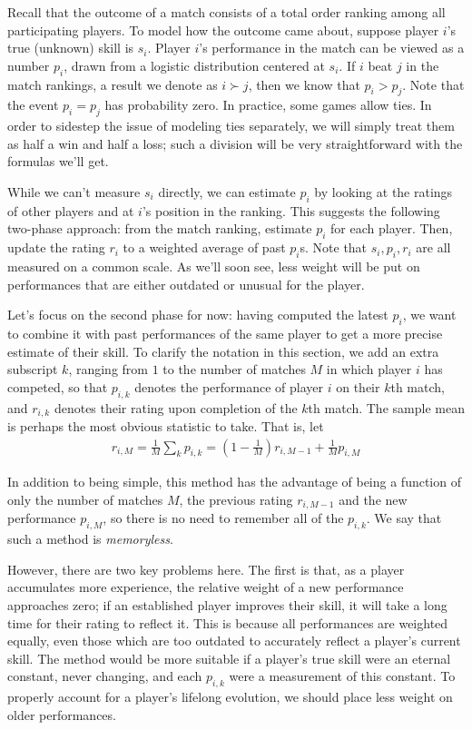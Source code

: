\documentclass{article}
\begin{document}
Recall that the outcome of a match consists of a total order ranking among all participating players. To model how the outcome came about, suppose player $i$'s true (unknown) skill is $s_i$. Player $i$'s performance in the match can be viewed as a number $p_i$, drawn from a logistic distribution centered at $s_i$. If $i$ beat $j$ in the match rankings, a result we denote as $i \succ j$, then we know that $p_i > p_j$. Note that the event $p_i = p_j$ has probability zero. In practice, some games allow ties. In order to sidestep the issue of modeling ties separately, we will simply treat them as half a win and half a loss; such a division will be very straightforward with the formulas we'll get.

While we can't measure $s_i$ directly, we can estimate $p_i$ by looking at the ratings of other players and at $i$'s position in the ranking. This suggests the following two-phase approach: from the match ranking, estimate $p_i$ for each player. Then, update the rating $r_i$ to a weighted average of past $p_i$s. Note that $s_i,p_i,r_i$ are all measured on a common scale. As we'll soon see, less weight will be put on performances that are either outdated or unusual for the player.

Let's focus on the second phase for now: having computed the latest $p_i$, we want to combine it with past performances of the same player to get a more precise estimate of their skill. To clarify the notation in this section, we add an extra subscript $k$, ranging from $1$ to the number of matches $M$ in which player $i$ has competed, so that $p_{i,k}$ denotes the performance of player $i$ on their $k$th match, and $r_{i,k}$ denotes their rating upon completion of the $k$th match. The sample mean is perhaps the most obvious statistic to take. That is, let
\begin{align}
r_{i,M} = \frac{1}{M} \sum_k p_{i,k} = \left(1 - \frac{1}{M}\right) r_{i,M-1} +  \frac{1}{M} p_{i,M}
\end{align}

In addition to being simple, this method has the advantage of being a function of only the number of matches $M$, the previous rating $r_{i,M-1}$ and the new performance $p_{i,M}$, so there is no need to remember all of the $p_{i,k}$. We say that such a method is \emph{memoryless}.

However, there are two key problems here. The first is that, as a player accumulates more experience, the relative weight of a new performance approaches zero; if an established player improves their skill, it will take a long time for their rating to reflect it. This is because all performances are weighted equally, even those which are too outdated to accurately reflect a player's current skill. The method would be more suitable if a player's true skill were an eternal constant, never changing, and each $p_{i,k}$ were a measurement of this constant. To properly account for a player's lifelong evolution, we should place less weight on older performances.
\end{document}
